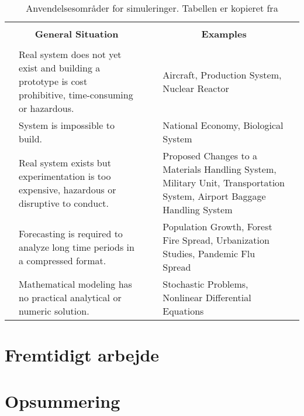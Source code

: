 \begin{table}[ht]
	\begin{tabularx}{\textwidth}{|p{15pt}Xp{15pt}|p{15pt}Xp{15pt}|}
  \hline  
  &&&&&\\
  \multicolumn{3}{|c|}{\textbf{General Situation}}&\multicolumn{3}{c|}{\textbf{Examples}} \\
  &&&&&\\  
  \hline
  & \vspace{5pt}Real system does not yet exist and building a prototype is cost prohibitive, time-consuming or hazardous. \vspace{5pt}& & & \vspace{5pt}Aircraft, Production System, Nuclear Reactor \vspace{5pt}& \\
  \hline  
  & \vspace{5pt}System is impossible to build.\vspace{5pt} & & & \vspace{3pt}National Economy, Biological System\vspace{5pt} &\\
  \hline
  & \vspace{5pt}Real system exists but experimentation is too expensive, hazardous or disruptive to conduct.\vspace{5pt} & & & \vspace{5pt}Proposed Changes to a Materials Handling System, Military Unit, Transportation System, Airport Baggage Handling System\vspace{5pt} & \\
  \hline
  & \vspace{5pt}Forecasting is required to analyze long time periods in a compressed format.\vspace{5pt} & & & \vspace{5pt}Population Growth, Forest Fire Spread, Urbanization Studies, Pandemic Flu Spread \vspace{5pt}&\\
  \hline
  & \vspace{5pt}Mathematical modeling has no practical analytical or numeric solution.\vspace{5pt} & & & \vspace{5pt}Stochastic Problems, Nonlinear Differential Equations\vspace{5pt} & \\
  \hline	
  \end{tabularx}
	\caption{Anvendelsesområder for simuleringer. Tabellen er kopieret fra \cite[10]{Mchaney2009}}
	\label{tab:simulation_examples}
\end{table}





 

\section{Fremtidigt arbejde}
\section{Opsummering}
